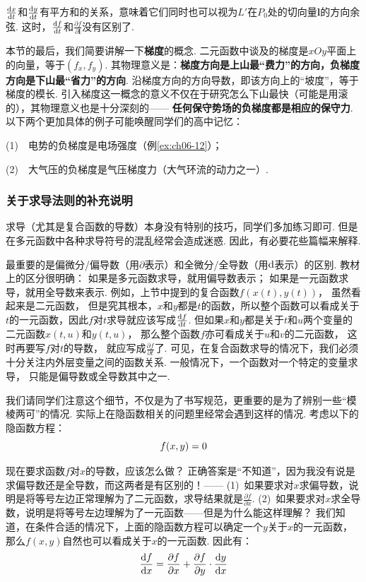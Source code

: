 $\frac{\mathrm{d} x}{\mathrm{d} t}$和$\frac{\mathrm{d} y}{\mathrm{d} t}$有平方和的关系，意味着它们同时也可以视为$L'$在$P_0$处的切向量$\bm{l}$的方向余弦.
这时，$\frac{\mathrm{d} f}{\mathrm{d} t}$和$\frac{\partial f}{\partial \bm{l}}$没有区别了.

本节的最后，我们简要讲解一下\textbf{梯度}的概念.
二元函数中谈及的梯度是$xOy$平面上的向量，等于$(f_x,f_y)$.
其物理意义是：\textbf{梯度方向是上山最“费力”的方向，负梯度方向是下山最“省力”的方向}.
沿梯度方向的方向导数，即该方向上的“坡度”，等于梯度的模长.
引入梯度这一概念的意义不仅在于研究怎么下山最快（可能是用滚的），其物理意义也是十分深刻的——
\textbf{任何保守势场的负梯度都是相应的保守力}.
以下两个更加具体的例子可能唤醒同学们的高中记忆：

(1)~~电势的负梯度是电场强度（例\ref{ex:ch06-12}）；

(2)~~大气压的负梯度是气压梯度力（大气环流的动力之一）.

\subsubsection{关于求导法则的补充说明}

求导（尤其是复合函数的导数）本身没有特别的技巧，同学们多加练习即可.
但是在多元函数中各种求导符号的混乱经常会造成迷惑.
因此，有必要花些篇幅来解释.

最重要的是偏微分/偏导数（用$\partial$表示）和全微分/全导数（用$\mathrm{d}$表示）的区别.
教材上的区分很明确：
如果是多元函数求导，就用偏导数表示；
如果是一元函数求导，就用全导数来表示.
例如，上节中提到的复合函数$f\left( x(t),y(t) \right)$，
虽然看起来是二元函数，
但是究其根本，$x$和$y$都是$t$的函数，所以整个函数可以看成关于$t$的一元函数，因此$f$对$t$求导就应该写成$\frac{\mathrm{d} f}{\mathrm{d} t}$.
但如果$x$和$y$都是关于$t$和$u$两个变量的二元函数$x(t,u)$和$y(t,u)$，
那么整个函数$f$亦可看成关于$u$和$v$的二元函数，
这时再要写$f$对$t$的导数，
就应写成$\frac{\partial f}{\partial t}$了.
可见，在复合函数求导的情况下，我们必须十分关注内外层变量之间的函数关系.
一般情况下，一个函数对一个特定的变量求导，
只能是偏导数或全导数其中之一.

我们请同学们注意这个细节，不仅是为了书写规范，更重要的是为了辨别一些“模棱两可”的情况.
实际上在隐函数相关的问题里经常会遇到这样的情况. 考虑以下的隐函数方程：
$$
\setlength\abovedisplayskip{6pt}
    \setlength\belowdisplayskip{6pt}
f(x,y) = 0
$$

现在要求函数$f$对$x$的导数，应该怎么做？
正确答案是“不知道”，因为我没有说是求偏导数还是全导数，而这两者是有区别的！——
(1)~如果要求对$x$求偏导数，说明是将等号左边正常理解为了二元函数，求导结果就是$\frac{\partial f}{\partial x}$.
(2)~如果要求对$x$求全导数，说明是将等号左边理解为了一元函数——但是为什么能这样理解？
我们知道，在条件合适的情况下，上面的隐函数方程可以确定一个$y$关于$x$的一元函数，
那么$f(x,y)$自然也可以看成关于$x$的一元函数. 因此有：
$$
\setlength\abovedisplayskip{12pt}
    \setlength\belowdisplayskip{12pt}
\frac{\d f}{\d x} = \frac{\partial f}{\partial x} + \frac{\partial f}{\partial y} \cdot \frac{\d y}{\d x}
$$

